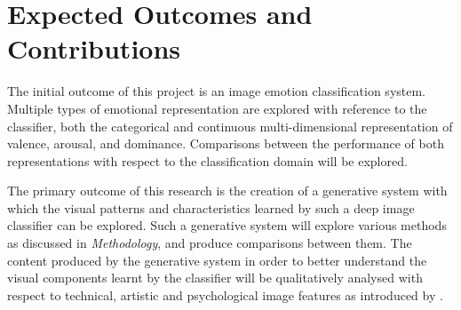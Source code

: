 \documentclass{article}
\begin{document}
\section{Expected Outcomes and Contributions}

The initial outcome of this project is an image emotion classification system.
Multiple types of emotional representation are explored with reference to the classifier, both the categorical and continuous multi-dimensional representation of valence, arousal, and dominance.
Comparisons between the performance of both representations with respect to the classification domain will be explored.

The primary outcome of this research is the creation of a generative system with which the visual patterns and characteristics learned by such a deep image classifier can be explored.
Such a generative system will explore various methods as discussed in \textit{Methodology}, and produce comparisons between them.
The content produced by the generative system in order to better understand the visual components learnt by the classifier will be qualitatively analysed with respect to technical, artistic and psychological image features as introduced by \citet{machajdik2010affective}.



\end{document}

